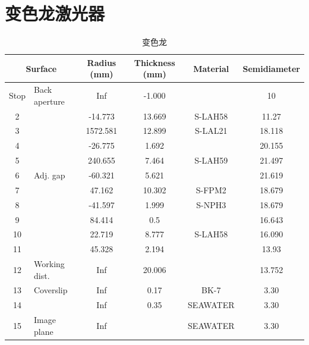 \thispagestyle{appendixheader}
\setcounter{app_fig}{1}
\setcounter{app_tab}{1}
\setcounter{equation}{0}
\renewcommand\theequation{附\arabic{app}-\arabic{equation}}
\renewcommand\chaptername{附录}
\renewcommand\chaptername{Appendix} 
\renewcommand\thechapter{附录\zhnum{app}} 

\setcounter{chapter}{0}
\setcounter{section}{0}


\chapter{变色龙激光器}\label{chap:app1}{
\setcounter{app_fig}{1}
\setcounter{app_tab}{1}

\begin{table}[htbp]
\centering
\caption{变色龙}
\label{tab:optical_prescription}
\begin{tabular}{|c|l|c|c|c|c|}
\hline
\multicolumn{2}{|c|}{Surface} & Radius (mm) & Thickness (mm) & Material & Semidiameter \\ \hline
Stop & Back aperture & Inf & -1.000 &  & 10 \\ \hline
2  &  & -14.773  & 13.669 & S-LAH58 & 11.27 \\
3  &  & 1572.581 & 12.899 & S-LAL21 & 18.118 \\
4  &  & -26.775  & 1.692  &         & 20.155 \\
5  &  & 240.655  & 7.464  & S-LAH59 & 21.497 \\
6  & Adj. gap      & -60.321 & 5.621  &         & 21.619 \\
7  &  & 47.162   & 10.302 & S-FPM2  & 18.679 \\
8  &  & -41.597  & 1.999  & S-NPH3  & 18.679 \\
9  &  & 84.414   & 0.5    &         & 16.643 \\
10 &  & 22.719   & 8.777  & S-LAH58 & 16.090 \\
11 &  & 45.328   & 2.194  &         & 13.93 \\
12 & Working dist.& Inf    & 20.006 &         & 13.752 \\
13 & Coverslip    & Inf    & 0.17   & BK-7    & 3.30 \\
14 &  & Inf       & 0.35   & SEAWATER & 3.30 \\
15 & Image plane  & Inf    &        & SEAWATER & 3.30 \\ \hline
\end{tabular}
\end{table}
}




